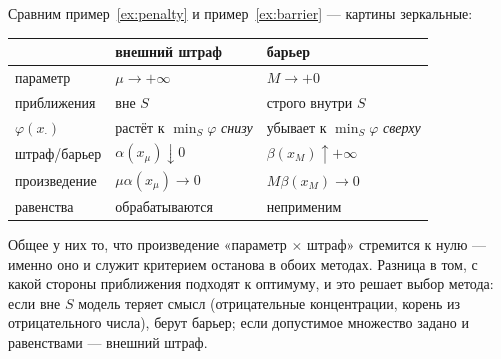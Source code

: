 \begin{idea}[title={Внешний штраф против барьера}]
Сравним пример~\ref{ex:penalty} и пример~\ref{ex:barrier} — картины
зеркальные:
\begin{center}
\begin{tabular}{lll}
\toprule
 & внешний штраф & барьер \\
\midrule
параметр        & $\mu \to +\infty$       & $M \to +0$ \\
приближения     & вне $S$                 & строго внутри $S$ \\
$\varphi(x_\cdot)$ & растёт к $\min_S\varphi$ \emph{снизу}
                & убывает к $\min_S\varphi$ \emph{сверху} \\
штраф/барьер    & $\alpha(x_\mu) \downarrow 0$
                & $\beta(x_M) \uparrow +\infty$ \\
произведение    & $\mu\alpha(x_\mu) \to 0$ & $M\beta(x_M) \to 0$ \\
равенства       & обрабатываются          & неприменим \\
\bottomrule
\end{tabular}
\end{center}
Общее у них то, что произведение «параметр $\times$ штраф» стремится к нулю —
именно оно и служит критерием останова в обоих методах. Разница в том, с какой
стороны приближения подходят к оптимуму, и это решает выбор метода: если вне
$S$ модель теряет смысл (отрицательные концентрации, корень из отрицательного
числа), берут барьер; если допустимое множество задано и равенствами —
внешний штраф.
\end{idea}
